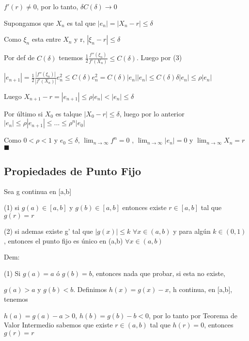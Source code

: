 \documentclass{article}
\begin{document}
 $f'(r) \not= 0$, por lo tanto, $\delta C(\delta) \rightarrow 0$

 Supongamos que $X_n$ es tal que $|e_n| = |X_n-r| \leq \delta$

 Como $\xi_n$ esta entre $X_n$ y r, $|\xi_n-r| \leq \delta$

 Por def de $C(\delta)$ tenemos $\frac{1}{2}\frac{f''(\xi_n)}{f'(X_n)} \leq C(\delta)$. Luego por (3)

 \vspace{5mm}

 $|e_{n+1}| = \frac{1}{2}\frac{|f''(\xi_n)|}{|f'(X_n)|}e_n^2 \leq C(\delta)e_n^2 = C(\delta)|e_n||e_n| \leq C(\delta)\delta |e_n| \leq \rho|e_n|$

 \vspace{5mm}

 Luego $X_{n+1}-r = |e_{n+1}| \leq \rho|e_n| < |e_n| \leq \delta$

 Por último si $X_0$ es talque $|X_0-r| \leq \delta$, luego por lo anterior $|e_n| \leq \rho|e_{n+1}| \leq ... \leq \rho^n|e_0|$

 Como $0<\rho<1$ y $e_0 \leq \delta$, $\lim_{n \to \infty} f^n = 0$ , $\lim_{n \to \infty} |e_n| = 0$ y $\lim_{n \to \infty} X_n = r$ $\blacksquare$


 

\vspace{10mm}

\subsection{Propiedades de Punto Fijo}\label{Punto}

Sea g continua en [a,b]

(1) si $g(a) \in [a,b]$ y $g(b) \in [a,b]$ entonces existe $r \in [a,b]$ tal que $g(r) = r$  

(2) si ademas existe g' tal que $|g(x)| \leq k$ $\forall x \in (a,b)$ y para algún $k \in (0,1)$, entonces el punto fijo 
es único en (a,b) $\forall x \in (a,b)$

\vspace{5mm}

Dem:

(1) Si $g(a) = a$ ó $g(b) = b$, entonces nada que probar, si esta no existe,

$g(a)>a$ y $g(b)<b$. Definimos $h(x) = g(x)-x$, h continua, en [a,b], tenemos

$h(a) = g(a)-a > 0$, $h(b) = g(b)-b < 0$, por lo tanto por Teorema de Valor Intermedio sabemos que
existe $ r \in (a,b)$ tal que $h(r)=0$, entonces $g(r) = r$
\end{document}
